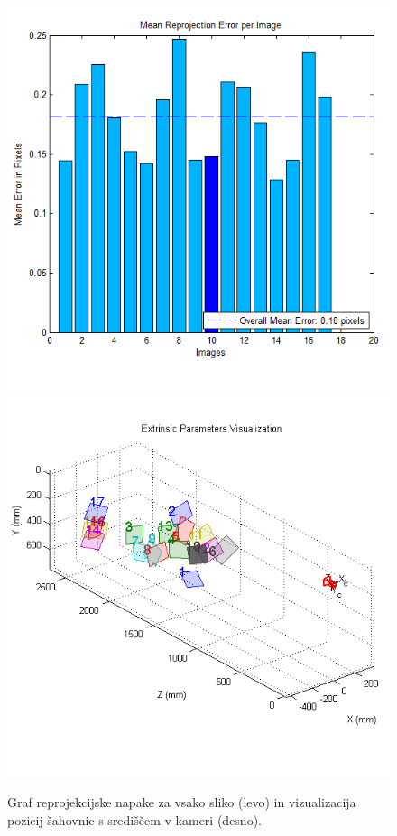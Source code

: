 \documentclass[a4paper, 12pt]{book}
\begin{document}
\begin{figure}[H]
\centering
\includegraphics[scale=0.35]{reprojection_error.png}
\includegraphics[scale=0.35]{extrinsic_visualization.png}
\caption{Graf reprojekcijske napake za vsako sliko (levo) in vizualizacija pozicij šahovnic s središčem v kameri (desno). }
\end{figure}
\end{document}
